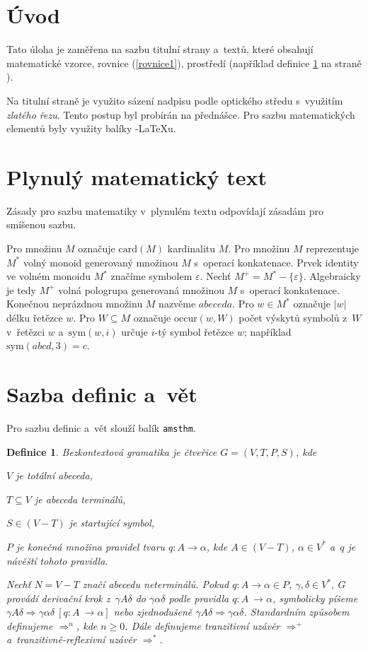 \documentclass[a4paper, 11pt, twocolumn]{article}[18.03.2012]
\newtheorem{defi}{Definice}[section]
\begin{document}

\section{Úvod}
Tato úloha je zaměřena na sazbu titulní strany a~textů, které obsahují
matematické vzorce, rovnice (\ref{rovnice1}), prostředí (například definice \ref{def:bezkon}
na straně \pageref{def:bezkon}).

Na titulní straně je využito sázení nadpisu podle optického středu s~využitím
\emph{zlatého řezu}. Tento postup byl probírán na přednášce. Pro sazbu matematických
elementů byly využity balíky \AmS-\LaTeX u.
\section{Plynulý matematický text}
Zásady pro sazbu matematiky v~plynulém textu odpovídají zásadám pro smíšenou
sazbu.

Pro množinu $M$ označuje $\mathrm{card}(M)$ kardinalitu $M$. Pro množinu $M$ reprezentuje $M^*$
volný monoid generovaný množinou $M$ s~operací konkatenace. Prvek identity ve
volném monoidu $M^*$ značíme symbolem $\varepsilon$. Nechť $M^+=M^*-\{\varepsilon\}$.
Algebraicky je tedy $M^+$ volná pologrupa generovaná množinou $M$ s~operací \-konkatenace. Konečnou
neprázdnou množinu $M$ nazvěme $abeceda$. Pro $w\in M^*$ označuje $|w|$ délku řetězce $w$.
Pro $W\subseteq M$ označuje $\mathrm{occur}(w,W)$ počet výskytů symbolů z~$W$ v~řetězci $w$
a~$\mathrm{sym}(w,i)$ určuje $i$-tý symbol řetězce $w$; například $\mathrm{sym}(abcd,3)=c$.
\section{Sazba definic a~vět}
Pro sazbu definic a~vět slouží balík \texttt{amsthm}.

\begin{defi} \label{def:bezkon}
\emph{Bezkontextová gramatika} je čtveřice $G=(V,T,P,S)$, kde
\begin{description*}
  \item[$V$] je totální abeceda,
  \item[$T\subseteq V$] je abeceda terminálů,
  \item[$S\in (V-T)$] je startující symbol,
  \item[$P$] je konečná množina \emph{pravidel} tvaru $q\colon A\rightarrow \alpha$, kde $A\in (V-T)$, $\alpha \in V^*$
a~$q$ je návěští tohoto
pravidla.
\end{description*}
Nechť $N=V-T$ značí abecedu neterminálů. Pokud $q\colon A\rightarrow \alpha \in P$, $\gamma,\delta \in V^*$, $G$
provádí derivační krok z~$\gamma A\delta$ do $\gamma \alpha \delta$ podle pravidla
$q\colon A~\rightarrow \alpha$, symbolicky píšeme $\gamma A\delta \Rightarrow \gamma \alpha \delta\ [q\colon A~\rightarrow \alpha]$
nebo zjednodušeně $\gamma A\delta \Rightarrow \gamma \alpha \delta$.
Standardním způsobem definujeme $\Rightarrow^n$, kde $n\geq 0$. Dále definujeme tranzitivní uzávěr
$\Rightarrow^+$ a~tranzitivně-reflexivní uzávěr $\Rightarrow^*$.
\end{defi}
\end{document}
